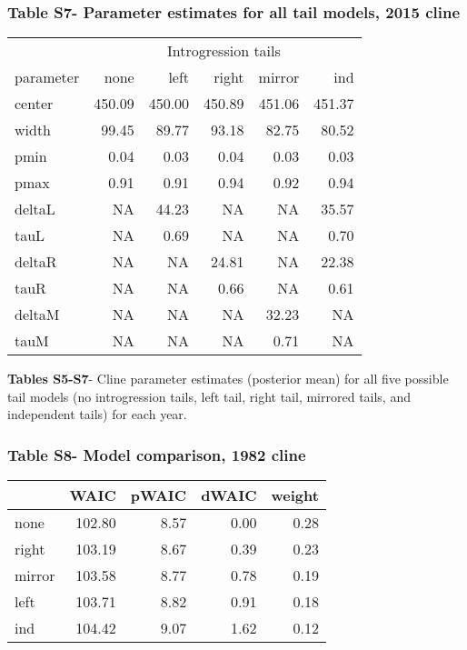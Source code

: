 \documentclass[]{article}
\begin{document}
\subsubsection{Table S7- Parameter estimates for all tail models, 2015
cline}\label{table-s7--parameter-estimates-for-all-tail-models-2015-cline}

\begin{table}[H]
\centering\begingroup\fontsize{9}{11}\selectfont

\begin{tabular}{lrrrrr}
\toprule
\multicolumn{1}{c}{ } & \multicolumn{5}{c}{Introgression tails} \\
\cmidrule(l{3pt}r{3pt}){2-6}
parameter & none & left & right & mirror & ind\\
\midrule
center & 450.09 & 450.00 & 450.89 & 451.06 & 451.37\\
width & 99.45 & 89.77 & 93.18 & 82.75 & 80.52\\
pmin & 0.04 & 0.03 & 0.04 & 0.03 & 0.03\\
pmax & 0.91 & 0.91 & 0.94 & 0.92 & 0.94\\
deltaL & NA & 44.23 & NA & NA & 35.57\\
tauL & NA & 0.69 & NA & NA & 0.70\\
deltaR & NA & NA & 24.81 & NA & 22.38\\
tauR & NA & NA & 0.66 & NA & 0.61\\
deltaM & NA & NA & NA & 32.23 & NA\\
tauM & NA & NA & NA & 0.71 & NA\\
\bottomrule
\end{tabular}
\endgroup{}
\end{table}

\textbf{Tables S5-S7}- Cline parameter estimates (posterior mean) for
all five possible tail models (no introgression tails, left tail, right
tail, mirrored tails, and independent tails) for each year.

\pagebreak

\subsubsection{Table S8- Model comparison, 1982
cline}\label{table-s8--model-comparison-1982-cline}

\begin{table}[H]
\centering
\begin{tabular}{lrrrr}
\toprule
  & WAIC & pWAIC & dWAIC & weight\\
\midrule
none & 102.80 & 8.57 & 0.00 & 0.28\\
right & 103.19 & 8.67 & 0.39 & 0.23\\
mirror & 103.58 & 8.77 & 0.78 & 0.19\\
left & 103.71 & 8.82 & 0.91 & 0.18\\
ind & 104.42 & 9.07 & 1.62 & 0.12\\
\bottomrule
\end{tabular}
\end{table}
\end{document}

